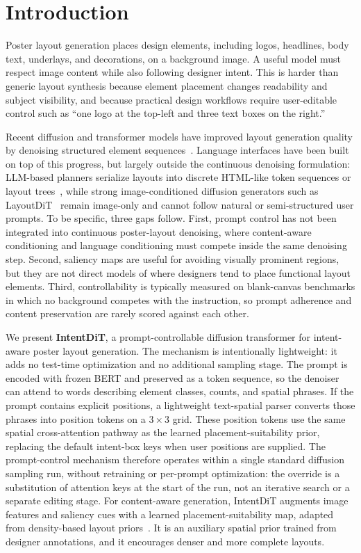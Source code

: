 \documentclass[review]{elsarticle}
\begin{document}
\section{Introduction}
\label{sec:intro}
Poster layout generation places design elements, including logos, headlines, body text, underlays, and decorations, on a background image. A useful model must respect image content while also following designer intent. This is harder than generic layout synthesis because element placement changes readability and
subject visibility, and because practical design workflows require user-editable control such as ``one logo at the top-left and three text boxes on the right.''

Recent diffusion and transformer models have improved layout generation quality by denoising structured element sequences~\cite{Ho20,Inoue23,Li24}.
Language interfaces have been built on top of this progress, but largely outside the continuous denoising formulation: LLM-based planners serialize layouts into discrete HTML-like token sequences or layout trees~\cite{Seol24PosterLlama,Hsu25,lin23b}, while strong image-conditioned diffusion generators such as LayoutDiT~\cite{Li24} remain image-only and cannot follow natural or semi-structured user prompts. To be specific, three gaps follow. First, prompt control has not been integrated into continuous poster-layout denoising, where content-aware conditioning and language conditioning must compete inside the same denoising step. Second, saliency maps are useful for avoiding visually prominent regions, but they are not direct models of where designers tend to place functional layout elements. Third, controllability is typically measured on blank-canvas benchmarks in which no background competes with the instruction, so prompt adherence and content preservation are rarely scored against each other.

We present \textbf{IntentDiT}, a prompt-controllable diffusion transformer for intent-aware poster layout generation.
The mechanism is intentionally lightweight: it adds no test-time optimization and no additional sampling stage. The prompt is encoded with frozen BERT and preserved as a token sequence, so the denoiser can attend to words describing element classes, counts, and spatial phrases.
If the prompt contains explicit positions, a lightweight text-spatial parser converts those phrases into position tokens on a $3{\times}3$ grid. These position tokens use the same spatial cross-attention pathway as the learned placement-suitability prior, replacing the default intent-box keys when user positions are supplied. The prompt-control mechanism therefore operates within a single standard diffusion sampling run, without retraining or per-prompt optimization: the override is a substitution of attention keys at the start of the run, not an iterative search or a separate editing stage.
For content-aware generation, IntentDiT augments image features and saliency cues with a learned placement-suitability map, adapted from density-based layout priors~\cite{Hsu23b,Hsu25}. It is an auxiliary spatial prior trained from designer annotations, and it encourages denser and more complete layouts.
\end{document}
